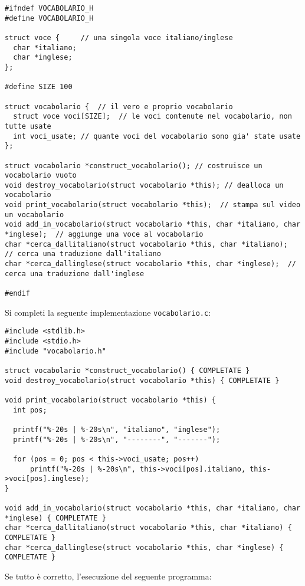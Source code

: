 \documentclass[italian,12pt]{article}
\begin{document}
{\scriptsize
\begin{verbatim}
#ifndef VOCABOLARIO_H
#define VOCABOLARIO_H

struct voce {     // una singola voce italiano/inglese
  char *italiano;
  char *inglese;
};

#define SIZE 100

struct vocabolario {  // il vero e proprio vocabolario
  struct voce voci[SIZE];  // le voci contenute nel vocabolario, non tutte usate
  int voci_usate; // quante voci del vocabolario sono gia' state usate
};

struct vocabolario *construct_vocabolario(); // costruisce un vocabolario vuoto
void destroy_vocabolario(struct vocabolario *this); // dealloca un vocabolario
void print_vocabolario(struct vocabolario *this);  // stampa sul video un vocabolario
void add_in_vocabolario(struct vocabolario *this, char *italiano, char *inglese);  // aggiunge una voce al vocabolario
char *cerca_dallitaliano(struct vocabolario *this, char *italiano);  // cerca una traduzione dall'italiano
char *cerca_dallinglese(struct vocabolario *this, char *inglese);  // cerca una traduzione dall'inglese

#endif
\end{verbatim}}

\noindent
Si completi la seguente implementazione \texttt{vocabolario.c}:

{\scriptsize
\begin{verbatim}
#include <stdlib.h>
#include <stdio.h>
#include "vocabolario.h"

struct vocabolario *construct_vocabolario() { COMPLETATE }
void destroy_vocabolario(struct vocabolario *this) { COMPLETATE }

void print_vocabolario(struct vocabolario *this) {
  int pos;

  printf("%-20s | %-20s\n", "italiano", "inglese");
  printf("%-20s | %-20s\n", "--------", "-------");

  for (pos = 0; pos < this->voci_usate; pos++)
      printf("%-20s | %-20s\n", this->voci[pos].italiano, this->voci[pos].inglese);
}

void add_in_vocabolario(struct vocabolario *this, char *italiano, char *inglese) { COMPLETATE }
char *cerca_dallitaliano(struct vocabolario *this, char *italiano) { COMPLETATE }
char *cerca_dallinglese(struct vocabolario *this, char *inglese) { COMPLETATE }
\end{verbatim}}

\noindent
Se tutto \`e corretto, l'esecuzione del seguente programma:
\end{document}
